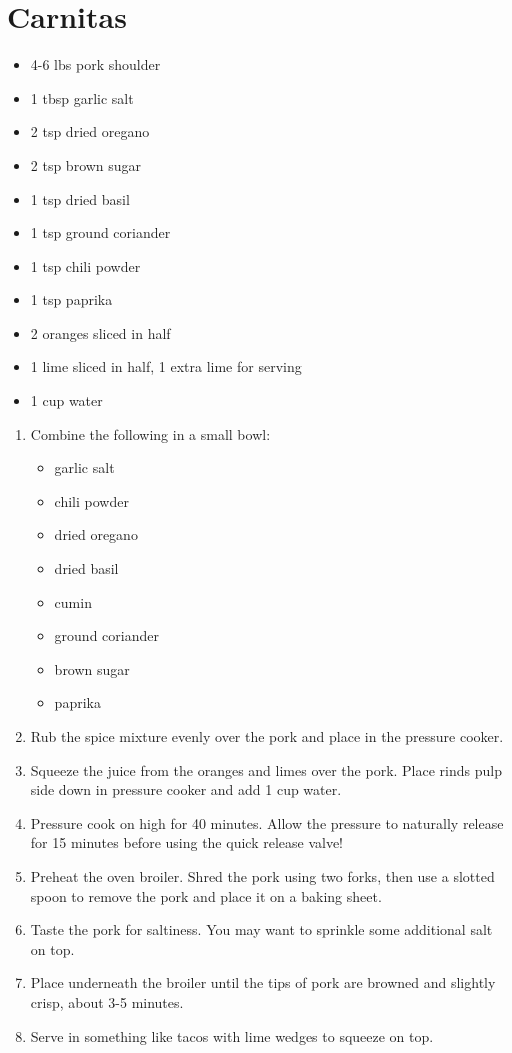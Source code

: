 \section{Carnitas}

\begin{itemize}
\item 4-6 lbs pork shoulder
\item 1 tbsp garlic salt
\item 2 tsp dried oregano
\item 2 tsp brown sugar
\item 1 tsp dried basil
\item 1 tsp ground coriander
\item 1 tsp chili powder
\item 1 tsp paprika
\item 2 oranges sliced in half
\item 1 lime sliced in half, 1 extra lime for serving
\item 1 cup water
\end{itemize}

\begin{enumerate}
\item Combine the following in a small bowl:
\begin{itemize}
    \item garlic salt
    \item chili powder
    \item dried oregano
    \item dried basil
    \item cumin
    \item ground coriander
    \item brown sugar
    \item paprika
\end{itemize}
\item Rub the spice mixture evenly over the pork and place in the pressure cooker.
\item Squeeze the juice from the oranges and limes over the pork. Place rinds pulp side down in pressure
cooker and add 1 cup water.
\item Pressure cook on high for 40 minutes. Allow the pressure to naturally release for 15 minutes before
using the quick release valve!
\item Preheat the oven broiler. Shred the pork using two forks, then use a slotted spoon to remove the
pork and place it on a baking sheet.
\item Taste the pork for saltiness. You may want to sprinkle some additional salt on top.
\item Place underneath the broiler until the tips of pork are browned and slightly crisp, about 3-5 minutes.
\item Serve in something like tacos with lime wedges to squeeze on top.
\end{enumerate}
